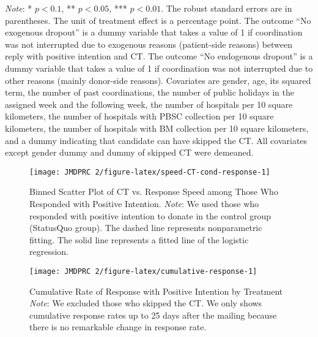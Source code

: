 \documentclass[12pt, a4paper]{article}
\begin{document}
\begin{table}[H]
\begin{threeparttable}
\begin{tablenotes}
\item \emph{Note}: * $p < 0.1$, ** $p < 0.05$, *** $p < 0.01$. The robust standard errors are in parentheses. The unit of treatment effect is a percentage point. The outcome ``No exogenous dropout'' is a dummy variable that takes a value of 1 if coordination was not interrupted due to exogenous reasons (patient-side reasons) between reply with positive intention and CT. The outcome ``No endogenous dropout'' is a dummy variable that takes a value of 1 if coordination was not interrupted due to other reasons (mainly donor-side reasons). Covariates are gender, age, its squared term, the number of past coordinations, the number of public holidays in the assigned week and the following week, the number of hospitals per 10 square kilometers, the number of hospitals with PBSC collection per 10 square kilometers, the number of hospitals with BM collection per 10 square kilometers, and a dummy indicating that candidate can have skipped the CT. All covariates except gender dummy and dummy of skipped CT were demeaned.
\end{tablenotes}
\end{threeparttable}
\end{table}

\begin{figure}[H]
\texttt{[image: JMDPRC~2/figure-latex/speed-CT-cond-response-1]} \caption{Binned Scatter Plot of CT vs. Response Speed among Those Who Responded with Positive Intention. \newline \emph{Note}: We used those who responded with positive intention to donate in the control group (StatusQuo group). The dashed line represents nonparametric fitting. The solid line represents a fitted line of the logistic regression.}\label{fig:speed-CT-cond-response}
\end{figure}

\begin{figure}[H]
\texttt{[image: JMDPRC~2/figure-latex/cumulative-response-1]} \caption{Cumulative Rate of Response with Positive Intention by Treatment \newline \emph{Note}: We excluded those who skipped the CT. We only shows cumulative response rates up to 25 days after the mailing because there is no remarkable change in response rate.}\label{fig:cumulative-response}
\end{figure}

\clearpage
\end{document}
